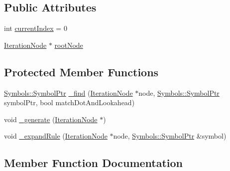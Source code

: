 \subsection*{Public Attributes}
\begin{DoxyCompactItemize}
\item 
int \mbox{\hyperlink{class_erable_1_1_compiler_1_1_parser_1_1_rule_iteration_ad2d208cfc66ecb245c84b13103a05f1f}{current\+Index}} = 0
\item 
\mbox{\hyperlink{struct_erable_1_1_compiler_1_1_parser_1_1_iteration_node}{Iteration\+Node}} $\ast$ \mbox{\hyperlink{class_erable_1_1_compiler_1_1_parser_1_1_rule_iteration_abde5cb07b4c7e8aa73bc636c082605a0}{root\+Node}}
\end{DoxyCompactItemize}
\subsection*{Protected Member Functions}
\begin{DoxyCompactItemize}
\item 
\mbox{\hyperlink{namespace_erable_1_1_compiler_1_1_symbols_a8f0bc762f448ea4d84e8713ab3e140b9}{Symbols\+::\+Symbol\+Ptr}} \mbox{\hyperlink{class_erable_1_1_compiler_1_1_parser_1_1_rule_iteration_abfa1a1f8f0b9ac2afa7c386203156f1c}{\+\_\+find}} (\mbox{\hyperlink{struct_erable_1_1_compiler_1_1_parser_1_1_iteration_node}{Iteration\+Node}} $\ast$node, \mbox{\hyperlink{namespace_erable_1_1_compiler_1_1_symbols_a8f0bc762f448ea4d84e8713ab3e140b9}{Symbols\+::\+Symbol\+Ptr}} symbol\+Ptr, bool match\+Dot\+And\+Lookahead)
\item 
void \mbox{\hyperlink{class_erable_1_1_compiler_1_1_parser_1_1_rule_iteration_a04aa2fb027d1e4787198c8c6373d1422}{\+\_\+generate}} (\mbox{\hyperlink{struct_erable_1_1_compiler_1_1_parser_1_1_iteration_node}{Iteration\+Node}} $\ast$)
\item 
void \mbox{\hyperlink{class_erable_1_1_compiler_1_1_parser_1_1_rule_iteration_a0dd755ac2b64434af8b386d9a5ec8d81}{\+\_\+expand\+Rule}} (\mbox{\hyperlink{struct_erable_1_1_compiler_1_1_parser_1_1_iteration_node}{Iteration\+Node}} $\ast$node, \mbox{\hyperlink{namespace_erable_1_1_compiler_1_1_symbols_a8f0bc762f448ea4d84e8713ab3e140b9}{Symbols\+::\+Symbol\+Ptr}} \&symbol)
\end{DoxyCompactItemize}


\subsection{Member Function Documentation}
\mbox{\label{class_erable_1_1_compiler_1_1_parser_1_1_rule_iteration_a0dd755ac2b64434af8b386d9a5ec8d81}} 
